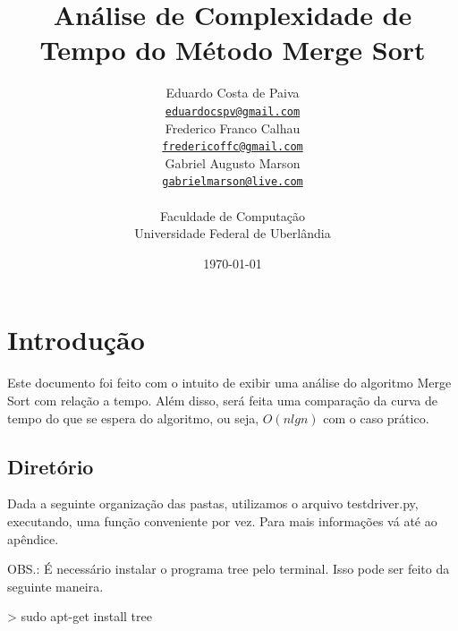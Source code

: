 \documentclass[12pt,a4paper,twoside]{report}
\title{Análise de Complexidade de Tempo do Método Merge Sort}
\date{}
\author{Eduardo Costa de Paiva \\
\texttt{\small \url{eduardocspv@gmail.com}}\\
Frederico Franco Calhau \\
\texttt{\small \url{fredericoffc@gmail.com}}\\
Gabriel Augusto Marson \\
\texttt{\small \url{gabrielmarson@live.com}}\\
\vspace{1cm} \\
Faculdade de Computação \\
Universidade Federal de Uberlândia
}
\date{\today}
\begin{document}
  \maketitle
\listoffigures
\listoftables
\lstlistoflistings

\tableofcontents


\fancyhead[RE,LO]{\thesection}

\setlength{\parskip}{0.15in} %

\chapter{Introdução}
Este documento foi feito com o intuito de exibir uma análise do algoritmo Merge Sort
com relação a tempo. Além disso, será feita uma comparação da curva de tempo do que se espera do
algoritmo, ou seja, $O(nlgn)$ com o caso prático.

\section{Diretório}

Dada a seguinte organização das pastas, utilizamos o arquivo testdriver.py,  executando, uma função conveniente por vez. Para mais informações vá até ao apêndice.

OBS.: É necessário instalar o programa tree pelo terminal. Isso pode ser feito da seguinte maneira.

\begin{terminal}
> sudo apt-get install tree
\end{terminal}
\end{document}
